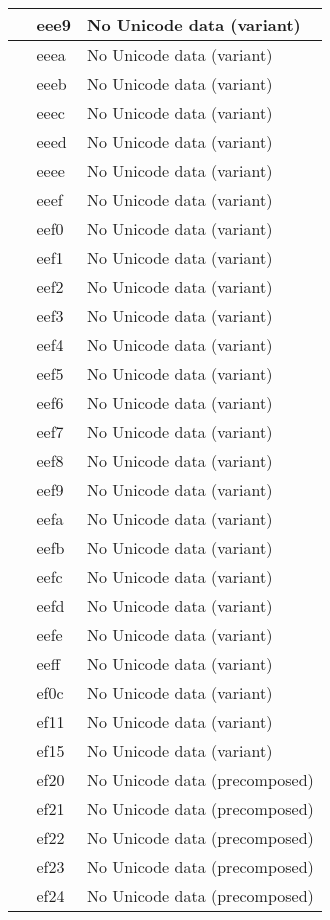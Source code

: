 \documentclass[12pt,letterpaper,openany]{book}
\begin{document}
\begin{center}
\begin{supertabular}{|m{0.25in}|m{0.5in}|m{4in}|}
 & eee9 & No Unicode data (variant)\\\hline
 & eeea & No Unicode data (variant)\\\hline
 & eeeb & No Unicode data (variant)\\\hline
 & eeec & No Unicode data (variant)\\\hline
 & eeed & No Unicode data (variant)\\\hline
 & eeee & No Unicode data (variant)\\\hline
 & eeef & No Unicode data (variant)\\\hline
 & eef0 & No Unicode data (variant)\\\hline
 & eef1 & No Unicode data (variant)\\\hline
 & eef2 & No Unicode data (variant)\\\hline
 & eef3 & No Unicode data (variant)\\\hline
 & eef4 & No Unicode data (variant)\\\hline
 & eef5 & No Unicode data (variant)\\\hline
 & eef6 & No Unicode data (variant)\\\hline
 & eef7 & No Unicode data (variant)\\\hline
 & eef8 & No Unicode data (variant)\\\hline
 & eef9 & No Unicode data (variant)\\\hline
 & eefa & No Unicode data (variant)\\\hline
 & eefb & No Unicode data (variant)\\\hline
 & eefc & No Unicode data (variant)\\\hline
 & eefd & No Unicode data (variant)\\\hline
 & eefe & No Unicode data (variant)\\\hline
 & eeff & No Unicode data (variant)\\\hline
 & ef0c & No Unicode data (variant)\\\hline
 & ef11 & No Unicode data (variant)\\\hline
 & ef15 & No Unicode data (variant)\\\hline
 & ef20 & No Unicode data (precomposed)\\\hline
 & ef21 & No Unicode data (precomposed)\\\hline
 & ef22 & No Unicode data (precomposed)\\\hline
 & ef23 & No Unicode data (precomposed)\\\hline
 & ef24 & No Unicode data (precomposed)\\\hline

\end{supertabular}
\end{center}
\end{document}
